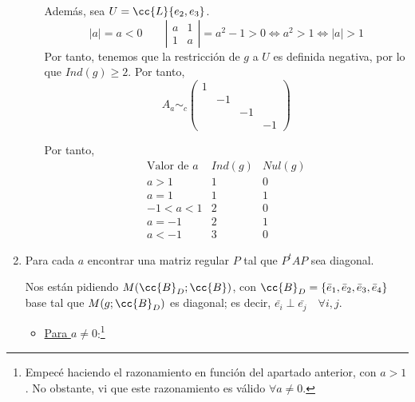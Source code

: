\begin{ejercicio}
\begin{enumerate}
\begin{enumerate}
            Además, sea $U=\cc{L}\{e_2, e_3\}$.
            \begin{equation*}
                |a|=a < 0 \qquad
                \left|\begin{array}{cc}
                    a & 1 \\
                    1 & a
                \end{array} \right| = a^2 - 1 > 0 \Longleftrightarrow a^2 > 1 \Longleftrightarrow |a|>1
            \end{equation*}
            Por tanto, tenemos que la restricción de $g$ a $U$ es definida negativa, por lo que $Ind(g)\geq 2$. Por tanto,
            \begin{equation*}
                A_a \sim_c \left( \begin{array}{cccc}
                1 &&& \\
                &-1&& \\
                &&-1&\\
                &&&-1
            \end{array} \right)
            \end{equation*}

            Por tanto,
            \begin{equation}
                \begin{array}{c|c|c}
                    \text{Valor de } a& Ind(g) & Nul(g) \\ \hline
                    a>1 & 1 & 0 \\
                    a=1 & 1 & 1 \\
                    -1<a<1 & 2 & 0 \\
                    a=-1 & 2 & 1 \\
                    a<-1 & 3 & 0
                \end{array}
            \end{equation}
            
        \end{enumerate}

        \item Para cada $a$ encontrar una matriz regular $P$ tal que $P^tAP$ sea diagonal.

        Nos están pidiendo $M(\cc{B}_D; \cc{B})$, con
        $\cc{B}_D=\{\bar{e}_1, \bar{e}_2, \bar{e}_3, \bar{e}_4\}$ base tal que $M(g;\cc{B}_D)$ es diagonal; es decir, $\bar{e_i}\perp \bar{e_j} \quad\forall i,j$.
        \begin{itemize}
            \item \underline{Para $a\neq 0$}:\footnote{Empecé haciendo el razonamiento en función del apartado anterior, con $a>1$. No obstante, vi que este razonamiento es válido $\forall a\neq 0$.}


\end{itemize}
\end{enumerate}
\end{ejercicio}
